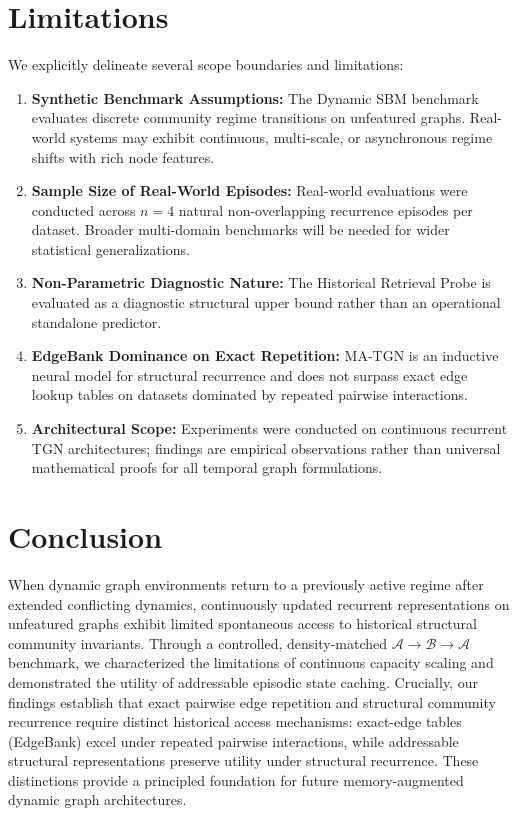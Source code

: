 \documentclass[10pt,twocolumn,letterpaper]{article}
\begin{document}
\section{Limitations}
\label{sec:limitations}

We explicitly delineate several scope boundaries and limitations:
\begin{enumerate}
    \item \textbf{Synthetic Benchmark Assumptions:} The Dynamic SBM benchmark evaluates discrete community regime transitions on unfeatured graphs. Real-world systems may exhibit continuous, multi-scale, or asynchronous regime shifts with rich node features.
    \item \textbf{Sample Size of Real-World Episodes:} Real-world evaluations were conducted across $n=4$ natural non-overlapping recurrence episodes per dataset. Broader multi-domain benchmarks will be needed for wider statistical generalizations.
    \item \textbf{Non-Parametric Diagnostic Nature:} The Historical Retrieval Probe is evaluated as a diagnostic structural upper bound rather than an operational standalone predictor.
    \item \textbf{EdgeBank Dominance on Exact Repetition:} MA-TGN is an inductive neural model for structural recurrence and does not surpass exact edge lookup tables on datasets dominated by repeated pairwise interactions.
    \item \textbf{Architectural Scope:} Experiments were conducted on continuous recurrent TGN architectures; findings are empirical observations rather than universal mathematical proofs for all temporal graph formulations.
\end{enumerate}

\section{Conclusion}
\label{sec:conclusion}

When dynamic graph environments return to a previously active regime after extended conflicting dynamics, continuously updated recurrent representations on unfeatured graphs exhibit limited spontaneous access to historical structural community invariants. Through a controlled, density-matched $\mathcal{A} \to \mathcal{B} \to \mathcal{A}$ benchmark, we characterized the limitations of continuous capacity scaling and demonstrated the utility of addressable episodic state caching. Crucially, our findings establish that exact pairwise edge repetition and structural community recurrence require distinct historical access mechanisms: exact-edge tables (EdgeBank) excel under repeated pairwise interactions, while addressable structural representations preserve utility under structural recurrence. These distinctions provide a principled foundation for future memory-augmented dynamic graph architectures.




\clearpage

\end{document}
